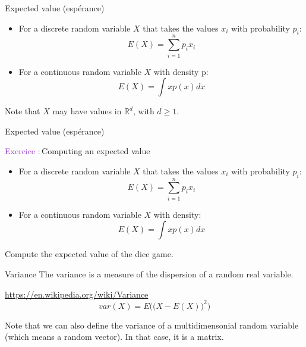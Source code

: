 \documentclass[usenames,dvipsnames,french]{beamer}
\newcounter{numexos}%
\newcommand{\exercice}[1]{%
\addtocounter{numexos}{1}%
\textcolor{DarkOrchid}{Exercice\,\thenumexos\,:}\,#1%
}
\begin{document}
\begin{frame}{Expected value (espérance)}
   \begin{itemize}
       \item For a discrete random variable $X$ that takes the values $x_i$ with probability $p_i$: 
	   \begin{equation}
	       E(X)= \sum^{n}_{i=1} p_ix_i
	   \end{equation}
       \item For a continuous random variable $X$ with density p: 
	   \begin{equation}
	       E(X)= \int xp(x)dx
	   \end{equation}
   \end{itemize} 

    Note that $X$ may have values in $ \mathbb{R}^d$, with $d\geq 1$.
\end{frame}

\begin{frame}{Expected value (espérance) }
    \exercice{Computing an expected value}
   \begin{itemize}
       \item For a discrete random variable $X$ that takes the values $x_i$ with probability $p_i$: 
	   \begin{equation}
	       E(X)= \sum^{n}_{i=1} p_ix_i
	   \end{equation}
       \item For a continuous random variable $X$ with density: 
	   \begin{equation}
	       E(X)= \int xp(x)dx
	   \end{equation}
   \end{itemize} 
   Compute the expected value of the dice game.
\end{frame}



\begin{frame}{Variance}
    The variance is a measure of the dispersion of a random real variable.

    \url{https://en.wikipedia.org/wiki/Variance } 
   \begin{equation}
       var(X) = E\Big(\big(X-E(X)\big)^2\Big)
   \end{equation}

    Note that we can also define the variance of a multidimensonial random variable (which means a random vector). In that case, it is a matrix.
\end{frame}
\end{document}
